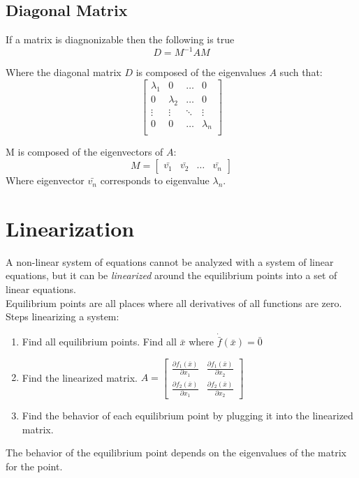 \documentclass[12pt]{article}
\begin{document}
\subsection*{Diagonal Matrix}
If a matrix is diagnonizable then the following is true
$$
D=M^{-1}AM
$$

\noindent
Where the diagonal matrix $D$ is composed of the eigenvalues $A$ such that:
$$
\begin{bmatrix}
	\lambda_1 & 0 & \dots & 0 \\
	0 & \lambda_2 & \dots & 0 \\
	\vdots & \vdots & \ddots & \vdots \\
	0 & 0 & \dots & \lambda_n \\
\end{bmatrix}
$$

\noindent 
M is composed of the eigenvectors of $A$:
$$
M = 
\begin{bmatrix}
	\bar{v_1} & \bar{v_2} & \dots & \bar{v_n}
\end{bmatrix}
$$
\noindent
Where eigenvector $\bar{v_n}$ corresponds to eigenvalue $\lambda_n$.

\newpage
\section*{Linearization}
A non-linear system of equations cannot be analyzed with a system of linear equations, but it can be {\em linearized} around the equilibrium points into a set of linear equations. \\
Equilibrium points are all places where all derivatives of all functions are zero. \\
Steps linearizing a system:
\begin{enumerate}
	\item Find all equilibrium points. Find all $\bar{x}$ where $\dot{\bar{f}}(\bar{x}) = \bar{0}$
	\item Find the linearized matrix. 
	$A=\begin{bmatrix}
		\frac{\partial f_1(\bar{x})}{\partial x_1} & \frac{\partial f_1(\bar{x})}{\partial x_2} \\
		\frac{\partial f_2(\bar{x})}{\partial x_1} & \frac{\partial f_2(\bar{x})}{\partial x_2}
	\end{bmatrix}$
	\item Find the behavior of each equilibrium point by plugging it into the linearized matrix.
\end{enumerate}

\noindent
The behavior of the equilibrium point depends on the eigenvalues of the matrix for the point. 
\end{document}
